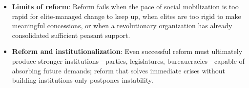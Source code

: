 \documentclass[12pt]{article}
\begin{document}
\begin{itemize}[leftmargin=*, itemsep=4pt]
    \item \textbf{Limits of reform}: Reform fails when the pace of social mobilization is too rapid for elite-managed change to keep up, when elites are too rigid to make meaningful concessions, or when a revolutionary organization has already consolidated sufficient peasant support.
    \item \textbf{Reform and institutionalization}: Even successful reform must ultimately produce stronger institutions---parties, legislatures, bureaucracies---capable of absorbing future demands; reform that solves immediate crises without building institutions only postpones instability.
\end{itemize}
\end{document}
